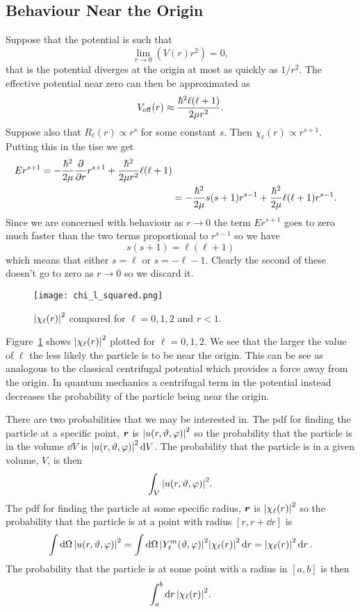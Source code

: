 \subsection{Behaviour Near the Origin}\label{sec:behaviour near the origin central potential}
Suppose that the potential is such that
\[\lim_{r\to 0}(V(r)r^2) = 0,\]
that is the potential diverges at the origin at most as quickly as \(1/r^2\).
The effective potential near zero can then be approximated as
\[V_{{\mathrm{eff}}}(r) \approx \frac{\hbar^2\ell(\ell + 1)}{2\mu r^2}.\]
Suppose also that \(R_\ell(r)\propto r^s\) for some constant \(s\).
Then \(\chi_\ell(r) \propto r^{s+1}\).
Putting this in the \gls{tise} we get
\begin{align*}
    Er^{s+1} = -\frac{\hbar^2}{2\mu}\pdv{r}r^{s + 1} + \frac{\hbar^2}{2\mu r^2}\ell(\ell + 1)\\
    &= -\frac{\hbar^2}{2\mu}s(s + 1)r^{s-1} + \frac{\hbar^2}{2\mu}\ell(\ell + 1)r^{s-1}.
\end{align*}
Since we are concerned with behaviour as \(r\to 0\) the term \(Er^{s+1}\) goes to zero much faster than the two terms proportional to \(r^{s-1}\) so we have
\[s(s + 1) = \ell(\ell + 1)\]
which means that either \(s = \ell\) or \(s = -\ell - 1\).
Clearly the second of these doesn't go to zero as \(r\to 0\) so we discard it.
\begin{figure}[ht]
    \centering
    \texttt{[image: chi\_l\_squared.png]}
    \caption{\(\abs{\chi_\ell(r)}^2\) compared for \(\ell = 0, 1, 2\) and \(r < 1\).}
    \label{fig:chi for low r}
\end{figure}
Figure~\ref{fig:chi for low r} shows \(\abs{\chi_\ell(r)}^2\) plotted for \(\ell = 0, 1, 2\).
We see that the larger the value of \(\ell\) the less likely the particle is to be near the origin.
This can be see as analogous to the classical centrifugal potential which provides a force away from the origin.
In quantum mechanics a centrifugal term in the potential instead decreases the probability of the particle being near the origin.

There are two probabilities that we may be interested in.
The \gls{pdf} for finding the particle at a specific point, \(\bm{r}\) is \(\abs{u(r, \vartheta, \varphi)}^2\) so the probability that the particle is in the volume \(\dd{V}\) is \(\abs{u(r, \vartheta, \varphi)}^2\dd{V}\).
The probability that the particle is in a given volume, \(V\), is then
\[\int_V \abs{u(r, \vartheta, \varphi)}^2.\]
The \gls{pdf} for finding the particle at some specific radius, \(\bm{r}\) is \(\abs{\chi_\ell(r)}^2\) so the probability that the particle is at a point with radius \([r, r + \dd{r}]\) is
\[\int\dd{\Omega}\abs{u(r, \vartheta, \varphi)}^2 = \int\dd{\Omega}\abs{Y_\ell^m(\vartheta, \varphi)}^2\abs{\chi_\ell(r)}^2\dd{r} = \abs{\chi_\ell(r)}^2\dd{r}.\]
The probability that the particle is at some point with a radius in \([a, b]\) is then
\[\int_a^b\dd{r}\abs{\chi_\ell(r)}^2.\]

